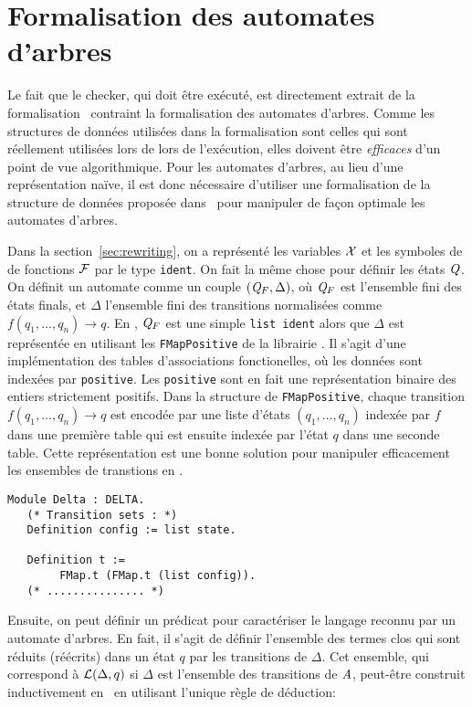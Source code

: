 \section{Formalisation des automates d'arbres}
\label{sec:automata}

Le fait que le checker, qui doit être exécuté, est directement extrait de la formalisation \coq\
contraint la formalisation des automates d'arbres. Comme les structures de données
utilisées dans la formalisation sont celles qui sont réellement utilisées
lors de lors de l'exécution, elles doivent être {\em efficaces} d'un point de vue algorithmique.
Pour les automates d'arbres, au lieu d'une représentation naïve, il est donc nécessaire d'utiliser 
une formalisation de la structure de données proposée dans~\cite{RivalGL-TPHOL01} pour manipuler de 
façon optimale les automates d'arbres.

\switchlstcoq


Dans la section~\ref{sec:rewriting}, on a représenté les variables $\mathcal X$ et les symboles de 
de fonctions $\mathcal{F}$ par le type \lstinline!ident!. On fait la même chose pour définir les états $\mathit Q$.
On définit un automate comme un couple $(\mathit Q_F, \Delta)$, où $\mathit Q_F$ est l'ensemble fini des 
états finals, et $\Delta$ l'ensemble fini des transitions normalisées comme $f(q_1, \dots, q_n) \rightarrow q$.
En \coq, $\mathit Q_F$ est une simple \lstinline!list ident! alors que $\Delta$ est représentée en utilisant les \lstinline!FMapPositive!
de la librairie \coq. Il s'agit d'une implémentation des tables d'associations fonctionelles, où les données sont indexées par \lstinline!positive!.
Les \lstinline!positive! sont en fait une représentation binaire des entiers strictement positifs.
Dans la structure de \lstinline!FMapPositive!, chaque transition $f(q_1, \dots, q_n) \rightarrow q$ est encodée par une liste d'états $(q_1, \dots, q_n)$ indexée par $f$
dans une première table qui est ensuite indexée par l'état $q$ dans une seconde table. Cette représentation est une bonne 
solution pour manipuler efficacement les ensembles de transtions en \coq.
%
%

\begin{lstlisting}
Module Delta : DELTA.
   (* Transition sets : *)
   Definition config := list state.
   
   Definition t := 
        FMap.t (FMap.t (list config)).
   (* ............... *)
\end{lstlisting}

%
%
Ensuite, on peut définir un prédicat pour caractériser le langage reconnu par un automate d'arbres.
En fait, il s'agit de définir l'ensemble des termes clos qui sont réduits (réécrits) dans un état 
$q$ par les transitions de $\Delta$. Cet ensemble, qui correspond à $\mathcal{L}(\Delta,q)$ si $\Delta$ 
est l'ensemble des transitions de $\mathit A$, peut-être construit inductivement en \coq\ en utilisant l'unique règle de déduction:


